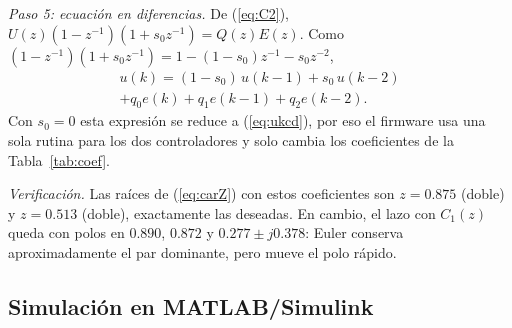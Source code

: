 \documentclass[conference]{IEEEtran}
\begin{document}
\textit{Paso 5: ecuación en diferencias.} De (\ref{eq:C2}),
$U(z)(1-z^{-1})(1+s_0z^{-1}) = Q(z)E(z)$. Como
$(1-z^{-1})(1+s_0z^{-1}) = 1 - (1-s_0)z^{-1} - s_0z^{-2}$,
\begin{multline}
  u(k) = (1-s_0)\,u(k-1) + s_0\,u(k-2)\\
  + q_0e(k) + q_1e(k-1) + q_2e(k-2).
  \label{eq:ukdd}
\end{multline}
Con $s_0 = 0$ esta expresión se reduce a (\ref{eq:ukcd}), por eso el
firmware usa una sola rutina para los dos controladores y solo cambia los
coeficientes de la Tabla~\ref{tab:coef}.

\textit{Verificación.} Las raíces de (\ref{eq:carZ}) con estos coeficientes son
$z = 0.875$ (doble) y $z = 0.513$ (doble), exactamente las deseadas. En cambio,
el lazo con $C_1(z)$ queda con polos en $0.890$, $0.872$ y
$0.277 \pm j0.378$: Euler conserva aproximadamente el par dominante, pero
mueve el polo rápido.

\begin{table}[!htb]
\centering
\caption{Coeficientes de los dos controladores}
\label{tab:coef}
\setlength{\tabcolsep}{5pt}
\end{table}

\FloatBarrier
\subsection{Simulación en MATLAB/Simulink}
\end{document}
